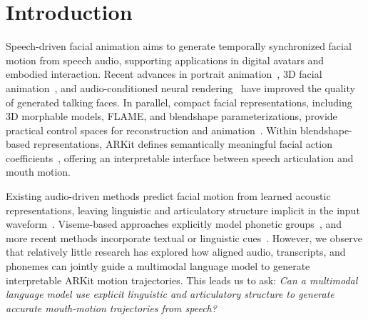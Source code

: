 \section{Introduction}
\label{sec:introduction}
\label{sec:intro}

Speech-driven facial animation aims to generate temporally synchronized facial motion from speech audio, supporting applications in digital avatars and embodied interaction.
Recent advances in portrait animation~\cite{ji2021audio,zhang2023sadtalker}, 3D facial animation~\cite{fan2022faceformer,xing2023codetalker}, and audio-conditioned neural rendering~\cite{guo2021ad} have improved the quality of generated talking faces.
In parallel, compact facial representations, including 3D morphable models, FLAME, and blendshape parameterizations, provide practical control spaces for reconstruction and animation~\cite{blanz2023morphable,li2017learning,menzel2022automated}.
Within blendshape-based representations, ARKit defines semantically meaningful facial action coefficients~\cite{apple_arkit}, offering an interpretable interface between speech articulation and mouth motion.

Existing audio-driven methods predict facial motion from learned acoustic representations, leaving linguistic and articulatory structure implicit in the input waveform~\cite{cudeiro2019voca,richard2021meshtalk,fan2022faceformer,park2023said}.
Viseme-based approaches explicitly model phonetic groups~\cite{zhou2018visemenet}, and more recent methods incorporate textual or linguistic cues~\cite{fan2022joint,xu2024kmtalk}.
However, we observe that relatively little research has explored how aligned audio, transcripts, and phonemes can jointly guide a multimodal language model to generate interpretable ARKit motion trajectories.
This leads us to ask: \emph{Can a multimodal language model use explicit linguistic and articulatory structure to generate accurate mouth-motion trajectories from speech?}

